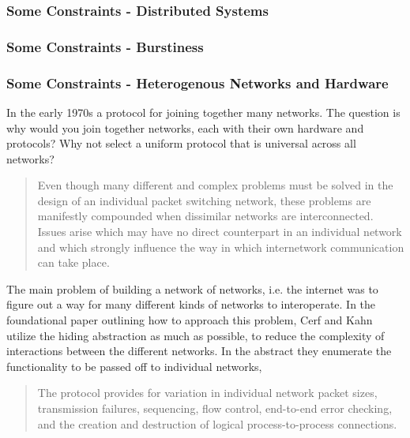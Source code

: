 \subsubsection{Some Constraints - Distributed Systems}

\subsubsection{Some Constraints - Burstiness}

\subsubsection{Some Constraints - Heterogenous Networks and Hardware}

In the early 1970s a protocol for joining together many networks. The question is why would you
join together networks, each with their own hardware and protocols? Why not select a uniform
protocol that is universal across all networks?

\begin{quote}
    Even though many different and complex problems must be solved in the design of an individual
    packet switching network, these problems are manifestly compounded when dissimilar networks are
    interconnected. Issues arise which may have no direct counterpart in an individual network and
    which strongly influence the way in which internetwork communication can take place.
    \cite{cerf1974}
\end{quote}



The main problem of building a network of networks, i.e. the internet was to figure out a way for
many different kinds of networks to interoperate. In the foundational paper outlining how to
approach this problem\cite{cerf1974}, Cerf and Kahn utilize the hiding abstraction as much as
possible, to reduce the complexity of interactions between the different networks. In the abstract
they enumerate the functionality to be passed off to individual networks, 

\begin{quote}
The protocol provides for variation in individual network packet sizes, transmission failures,
sequencing, flow control, end-to-end error checking, and the creation and destruction of logical
process-to-process connections.
\end{quote}

